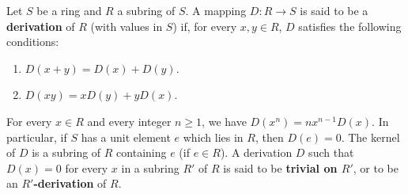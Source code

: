 Let $S$ be a ring and $R$ a subring of $S$. A mapping $D : R \to S$ is said to be a \textbf{derivation} of $R$ (with values in $S$) if, for every $x, y \in R$, $D$ satisfies the following conditions:
\begin{enumerate}
\item $D(x + y) = D(x) + D(y)$.
\item $D(xy) = xD(y) + yD(x)$.
\end{enumerate}

For every $x \in R$ and every integer $n \geq 1$, we have $D(x^n) = n x^{n-1} D(x)$. In particular, if $S$ has a unit element $e$ which lies in $R$, then $D(e) = 0$. The kernel of $D$ is a subring of $R$ containing $e$ (if $e \in R$). A derivation $D$ such that $D(x) = 0$ for every $x$ in a subring $R'$ of $R$ is said to be \textbf{trivial on $R'$}, or to be an \textbf{$R'$-derivation} of $R$.
